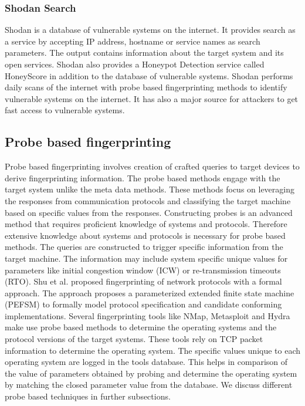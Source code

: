\documentclass[letterpaper, 10 pt, conference]{ieeeconf}  %
\begin{document}
\subsubsection{Shodan Search}
Shodan is a database of vulnerable systems on the internet. It provides search as a service by accepting IP address, hostname or service names as search parameters. The output contains information about the target system and its open services. Shodan also provides a Honeypot Detection service called HoneyScore \cite{SHODAN} in addition to the database of vulnerable systems. Shodan performs daily scans of the internet with probe based fingerprinting methods to identify vulnerable systems on the internet. It has also a major source for attackers to get fast access to vulnerable systems. 

\subsection{Probe based fingerprinting}
Probe based fingerprinting involves creation of crafted queries to target devices to derive fingerprinting information. The probe based methods engage with  the target system unlike the meta data methods. These methods focus on leveraging the responses from communication protocols and classifying the target machine based on specific values from the responses. Constructing probes is an advanced method that requires proficient knowledge of systems and protocols. Therefore extensive knowledge about systems and protocols is necessary for probe based methods. The queries are constructed to trigger specific information from the target machine. The information may include system specific unique values for parameters like initial congestion window (ICW) or re-transmission timeouts (RTO). 
Shu et al.\cite{shu2006network} proposed fingerprinting of network protocols with a formal approach. The approach proposes a parameterized extended finite state machine (PEFSM) to formally model protocol specification and candidate conforming implementations. Several fingerprinting tools like NMap, Metasploit and Hydra make use probe based  methods to determine the operating systems and the protocol versions of the target systems. These tools rely on TCP packet information to determine the operating system. The specific values unique to each operating system are logged in  the tools database. This helps in comparison of the value of parameters obtained by probing and determine the operating system by matching the closed parameter value from the database. We discuss different probe based techniques in further subsections. 
\end{document}
